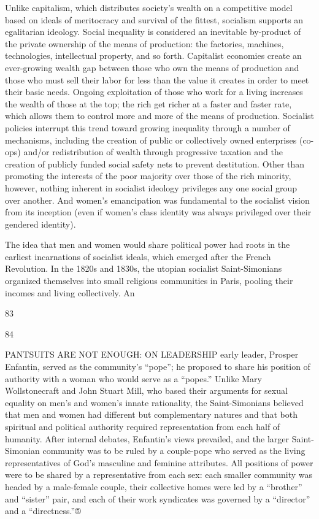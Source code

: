 Unlike capitalism, which distributes society’s wealth on a competitive model based on ideals of meritocracy and survival of the fittest, socialism supports an egalitarian ideology. Social inequality is considered an inevitable by-product of the private ownership of the means of production: the factories, machines, technologies, intellectual property, and so forth. Capitalist economies create an ever-growing wealth gap between those who own the means of production and those who must sell their labor for less than the value it creates in order to meet their basic needs. Ongoing exploitation of those who work for a living increases the wealth of those at the top; the rich get richer at a faster and faster rate, which allows them to control more and more of the means of production. Socialist policies interrupt this trend toward growing inequality through a number of mechanisms, including the creation of public or collectively owned enterprises (co-ops) and/or redistribution of wealth through progressive taxation and the creation of publicly funded social safety nets to prevent destitution. Other than promoting the interests of the poor majority over those of the rich minority, however, nothing inherent in socialist ideology privileges any one social group over another. And women’s emancipation was fundamental to the socialist vision from its inception (even if women’s class identity was always privileged over their gendered identity).
 \par 
The idea that men and women would share political power had roots in the earliest incarnations of socialist ideals, which emerged after the French Revolution. In the 1820s and 1830s, the utopian socialist Saint-Simonians organized themselves into small religious communities in Paris, pooling their incomes and living collectively. An
 \par 
83
 \par 
84
 \par 
PANTSUITS ARE NOT ENOUGH: ON LEADERSHIP early leader, Prosper Enfantin, served as the community's “pope”; he proposed to share his position of authority with a woman who would serve as a “popes.” Unlike Mary Wollstonecraft and John Stuart Mill, who based their arguments for sexual equality on men’s and women’s innate rationality, the Saint-Simonians believed that men and women had different but complementary natures and that both spiritual and political authority required representation from each half of humanity. After internal debates, Enfantin’s views prevailed, and the larger Saint-Simonian community was to be ruled by a couple-pope who served as the living representatives of God’s masculine and feminine attributes. All positions of power were to be shared by a representative from each sex: each smaller community was headed by a male-female couple, their collective homes were led by a “brother” and “sister” pair, and each of their work syndicates was governed by a “director” and a “directness.”®
